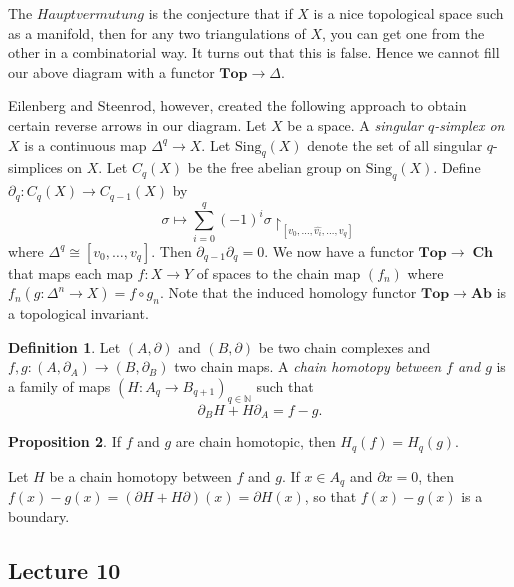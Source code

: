 \documentclass[10pt,letterpaper,cm]{nupset}
\theoremstyle{definition}
\newtheorem{definition}{Definition}[subsection]
\theoremstyle{theorem}
\newtheorem{prop}[definition]{Proposition}
\theoremstyle{remark}
\newcommand{\N}{\mathbb N}
\newcommand{\1}{\mathbb{1}}
\newcommand{\0}{\vec 0}
\DeclareMathOperator{\ch}{\mathbf{Ch}}
\begin{document}
\smallskip

The $\textit{Hauptvermutung}$ is the conjecture that if $X$ is a nice topological space such as a manifold, then for any two triangulations of $X$, you  can get one from the other in a combinatorial way. It turns out that this is false. Hence we cannot fill our above diagram with a functor $\mathbf{Top} \to \Delta$.

Eilenberg and Steenrod, however, created the following approach to obtain certain reverse arrows in our diagram. Let $X$ be a space. A \textit{singular $q$-simplex on $X$}  is a continuous map $\Delta^q \to X$. Let $\text{Sing}_q(X)$ denote the set of all singular $q$-simplices on $X$. Let $C_q(X)$ be the free abelian group on $\text{Sing}_q(X)$. Define $\partial_{q} : C_q(X) \to C_{q-1}(X)$ by 
$$\sigma \mapsto \sum_{i=0}^q({-1})^i \sigma \restriction_{\left[v_0, \ldots, \widehat{v_i}, \ldots, v_q\right]}$$ 
where $\Delta^q \cong \left[v_0, \ldots, v_q\right]$. Then $\partial_{q-1}\partial_q =0$. We now have a functor $\mathbf{Top} \to \ch$ that maps each map $f: X \to Y$ of spaces to the chain map $(f_n)$ where $f_n(g: \Delta^n \to X) = f \circ g_n$. Note that the induced homology functor $\mathbf{Top} \to \mathbf{Ab}$ is a topological invariant. 

\smallskip




\begin{definition}
Let $(A, \partial)$ and $(B, \partial)$ be two chain complexes and $f,g : (A, \partial_A) \to (B, \partial_B)$ two chain maps. A \textit{chain homotopy between $f$ and $g$} is a family of maps $\left(H: A_q \to B_{q+1}\right)_{q\in \N}$ such that $$\partial_B H + H\partial_A = f-g.$$
\end{definition}

\begin{prop}
If $f$ and $g$ are chain homotopic, then $H_q(f) = H_q(g)$. 
\end{prop}


Let $H$ be a chain homotopy between $f$ and $g$. If $x\in A_q$ and $\partial{x} = 0$, then $f(x) -g(x) = (\partial H + H \partial)(x) = \partial H(x)$, so that $f(x) -g(x)$ is a boundary. 



\subsection{Lecture 10}
\end{document}
